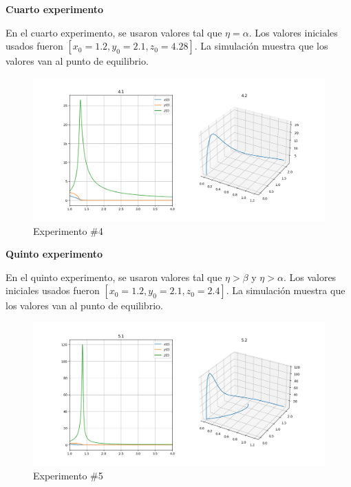 \documentclass{wscpaperproc}
\theoremstyle{wsc}
\begin{document}
\vspace*{7cm}
{\bf Cuarto experimento}

En el cuarto experimento, se usaron valores tal que $\eta = \alpha$.
Los valores iniciales usados fueron $[x_0=1.2, y_0=2.1, z_0=4.28]$. La simulación muestra
que los valores van al punto de equilibrio.

\begin{figure}[h!]
	\includegraphics[width=\linewidth]{../numerical_models/images/4.png}
	\caption{Experimento \#4}
\end{figure}

\vspace*{7cm}
{\bf Quinto experimento}

En el quinto experimento, se usaron valores tal que $\eta > \beta$ y $\eta > \alpha$.
Los valores iniciales usados fueron $[x_0=1.2, y_0=2.1, z_0=2.4]$. La simulación muestra
que los valores van al punto de equilibrio.

\begin{figure}[h!]
	\includegraphics[width=\linewidth]{../numerical_models/images/5.png}
	\caption{Experimento \#5}
\end{figure}

\vspace*{4cm}
\end{document}

